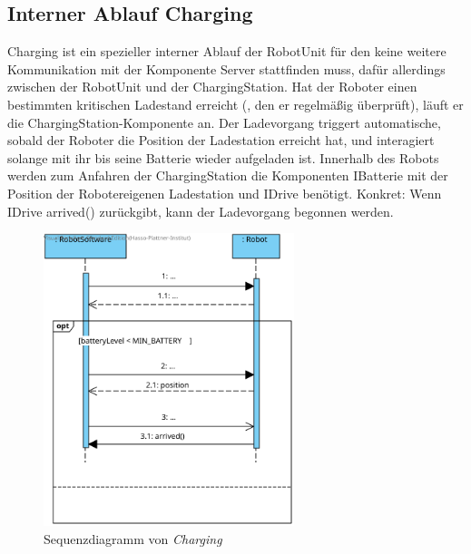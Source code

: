 	\subsection*{Interner Ablauf Charging}
	Charging ist ein spezieller interner Ablauf der RobotUnit für den keine weitere Kommunikation mit der Komponente Server stattfinden muss, dafür allerdings zwischen der RobotUnit und der ChargingStation. 
	Hat der Roboter einen bestimmten kritischen Ladestand erreicht (, den er regelmäßig überprüft), läuft er die ChargingStation-Komponente an. 
	Der Ladevorgang triggert automatische, sobald der Roboter die Position der Ladestation erreicht hat, und interagiert solange mit ihr bis seine Batterie wieder aufgeladen ist. 
	Innerhalb des Robots werden zum Anfahren der ChargingStation die Komponenten IBatterie mit der Position der Robotereigenen Ladestation und IDrive benötigt. 
	Konkret: Wenn IDrive arrived() zurückgibt, kann der Ladevorgang begonnen werden.
	\vspace{1cm}
	
	\begin{figure}[H]
		\centering
		\includegraphics[width=0.65\textwidth]{img/0-Entwurf-8-Charging}
		\caption{Sequenzdiagramm von \textit{Charging}}
		\label{Charging}
	\end{figure}
